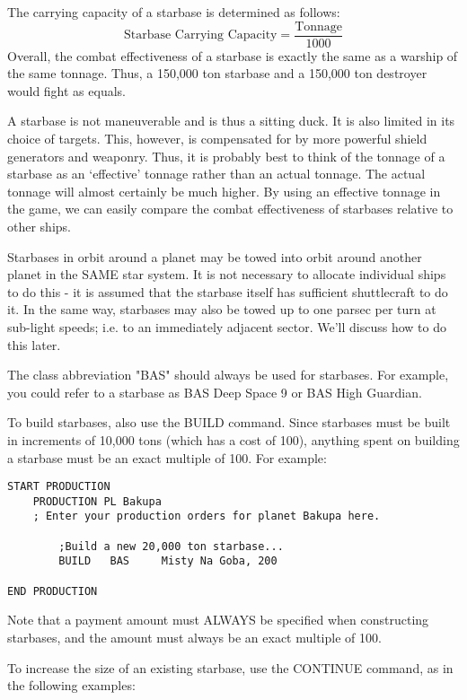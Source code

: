 \documentclass[10pt,titlepage]{article}
\begin{document}
The carrying capacity of a starbase is determined as follows:
\[
	\textrm{Starbase Carrying Capacity}  =   \dfrac{\textrm{Tonnage}}{1000}
\]
Overall, the combat effectiveness of a starbase is exactly the same as a
warship of the same tonnage.  Thus, a 150,000 ton starbase and a 150,000 ton
destroyer would fight as equals.

\begin{informationnote}
A starbase is not maneuverable and is thus a sitting duck.  It is also limited
in its choice of targets.  This, however, is compensated for by more powerful
shield generators and weaponry.  Thus, it is probably best to think of the
tonnage of a starbase as an `effective' tonnage rather than an actual tonnage.
The actual tonnage will almost certainly be much higher.  By using an effective
tonnage in the game, we can easily compare the combat effectiveness of
starbases relative to other ships.
\end{informationnote}

\noindent Starbases in orbit around a planet may be towed into orbit around another
planet in the SAME star system.  It is not necessary to allocate individual
ships to do this - it is assumed that the starbase itself has sufficient
shuttlecraft to do it.  In the same way, starbases may also be towed up to one
parsec per turn at sub-light speeds; i.e. to an immediately adjacent sector.
We'll discuss how to do this later.

The class abbreviation "BAS" should always be used for starbases.  For example,
you could refer to a starbase as BAS Deep Space 9 or BAS High Guardian.

To build starbases, also use the BUILD command.  Since starbases must be built
in increments of 10,000 tons (which has a cost of 100), anything spent on
building a starbase must be an exact multiple of 100.  For example:

\begin{verbatim}
START PRODUCTION
    PRODUCTION PL Bakupa
    ; Enter your production orders for planet Bakupa here.

        ;Build a new 20,000 ton starbase...
        BUILD   BAS     Misty Na Goba, 200

END PRODUCTION
\end{verbatim} 

Note that a payment amount must ALWAYS be specified when constructing
starbases, and the amount must always be an exact multiple of 100.

To increase the size of an existing starbase, use the CONTINUE command, as in
the following examples:
\end{document}

